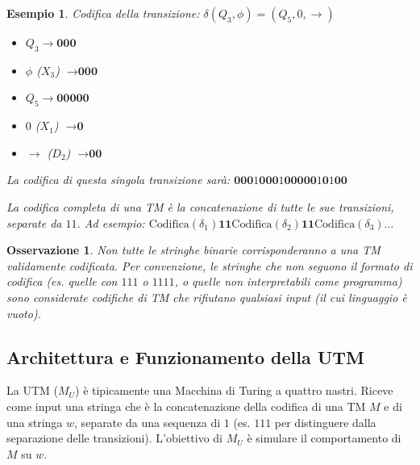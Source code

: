 \documentclass[a4paper]{article}
\newtheorem{example}{Esempio}
\newtheorem{remark}{Osservazione}
\begin{document}
\begin{example}
Codifica della transizione: $\delta(Q_3, \phi) = (Q_5, 0, \rightarrow)$
\begin{itemize}
    \item $Q_3 \rightarrow \textbf{000}$
    \item $\phi$ ($X_3$) $\rightarrow \textbf{000}$
    \item $Q_5 \rightarrow \textbf{00000}$
    \item $0$ ($X_1$) $\rightarrow \textbf{0}$
    \item $\rightarrow$ ($D_2$) $\rightarrow \textbf{00}$
\end{itemize}
La codifica di questa singola transizione sarà:
$\textbf{000} \text{1} \textbf{000} \text{1} \textbf{00000} \text{1} \textbf{0} \text{1} \textbf{00}$

La codifica completa di una TM è la concatenazione di tutte le sue transizioni, separate da $11$. Ad esempio:
$\text{Codifica}(\delta_1) \textbf{11} \text{Codifica}(\delta_2) \textbf{11} \text{Codifica}(\delta_3) \dots$
\end{example}

\begin{remark}
Non tutte le stringhe binarie corrisponderanno a una TM validamente codificata. Per convenzione, le stringhe che non seguono il formato di codifica (es. quelle con $111$ o $1111$, o quelle non interpretabili come programma) sono considerate codifiche di TM che rifiutano qualsiasi input (il cui linguaggio è vuoto).
\end{remark}

\subsection{Architettura e Funzionamento della UTM}

La UTM ($M_U$) è tipicamente una Macchina di Turing a quattro nastri. Riceve come input una stringa che è la concatenazione della codifica di una TM $M$ e di una stringa $w$, separate da una sequenza di $1$ (es. $111$ per distinguere dalla separazione delle transizioni). L'obiettivo di $M_U$ è simulare il comportamento di $M$ su $w$.
\end{document}

